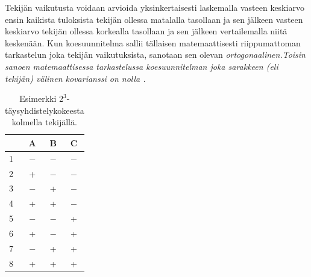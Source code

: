 \documentclass[12pt,a4paper,finnish]{tutthesis}
\begin{document}
Tekijän vaikutusta voidaan arvioida yksinkertaisesti laskemalla vasteen keskiarvo
ensin kaikista tuloksista tekijän ollessa matalalla tasollaan ja sen jälkeen
vasteen keskiarvo tekijän ollessa korkealla tasollaan ja sen jälkeen
vertailemalla niitä keskenään. Kun koesuunnitelma sallii tällaisen matemaattisesti
riippumattoman tarkastelun joka tekijän vaikutuksista, sanotaan
sen olevan \em ortogonaalinen.\em Toisin sanoen matemaattisessa
tarkastelussa koesuunnitelman joka sarakkeen (eli tekijän) välinen kovarianssi
on nolla \parencite{barker2005}.



\begin{table}[h]
  \begin{center}
  \caption{Esimerkki $2^3$-täysyhdistelykokeesta kolmella tekijällä.}
  \label{tab:fullf}
  \begin{tabular}{ | l | c | c | c | }
    \hline
     & \textbf{A} & \textbf{B} & \textbf{C} \\ \hline
    1 & $-$ & $-$ & $-$\\ \hline
    2 & + & $-$ & $-$\\ \hline
    3 & $-$ & + & $-$\\ \hline
    4 & + & + & $-$\\ \hline
    5 & $-$ & $-$ & +\\ \hline
    6 & + & $-$ & +\\ \hline
    7 & $-$ & + & +\\ \hline
    8 & + & + & +\\ \hline
  \end{tabular}
  \end{center}
\end{table}
\end{document}
